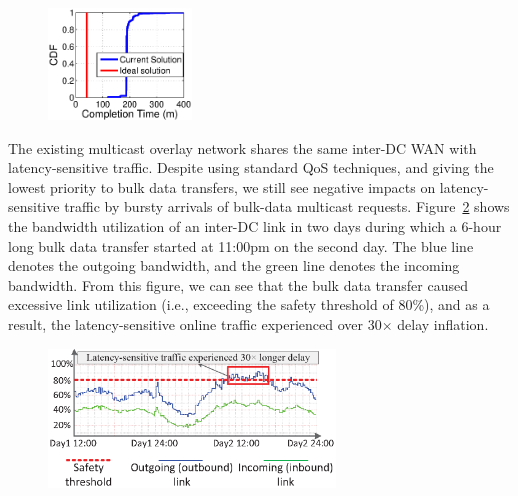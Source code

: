 \begin{figure}[t]
  \centering
  \includegraphics[width=1.5in]{images/SEvsIdeal.eps}
  \vspace{-0.2cm}
  \label{fig:motivation}
\vspace{-0.4cm}
\end{figure}

The existing multicast overlay network shares the same inter-DC WAN
with latency-sensitive traffic. Despite using standard QoS techniques,
and giving the lowest priority to bulk data transfers, we still see
negative impacts on latency-sensitive traffic by bursty arrivals of
bulk-data multicast requests. Figure~\ref{fig:lesson2} shows the
bandwidth utilization of an inter-DC link in two days during which a
6-hour long bulk data transfer started at 11:00pm on the second day.
The blue line denotes the outgoing bandwidth, and the green line
denotes the incoming bandwidth. From this figure, we can see that the
bulk data transfer caused excessive link utilization (i.e., exceeding
the safety threshold of 80\%), and as a result, the latency-sensitive
online traffic experienced over 30$\times$ delay inflation.



\begin{figure}[t!]
        \center
        \includegraphics[width=3in]{images/nj02-M2A_0212-0216_v3.eps}
        \label{fig:lesson2}
\vspace{-0.1in}
\end{figure}

